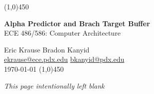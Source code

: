 \documentclass{article}
\begin{document}
\pagestyle{empty}
\begin{center}
\vspace*{.5in}

\line(1,0){450}
\vspace{18pt}


{\LARGE \textbf{Alpha Predictor and Brach Target Buffer}}\\

\vspace{4pt}
{\LARGE ECE 486/586: Computer Architecture}\\

\vspace{8pt}

{\Large Eric Krause \hspace{2in} Bradon Kanyid}\\
\vspace{2pt}
{\large \url{ekrause@ece.pdx.edu} \hspace{2in} \url{bkanyid@pdx.edu}}\\
\vspace{2pt}
{\large \today}
\vspace{2pt}
\line(1,0){450}\\
\vspace{12pt}


\newpage

\vspace*{3.5in}
{\it This page intentionally left blank}
\end{center}
\newpage
\setcounter{page}{1}
\end{document}
